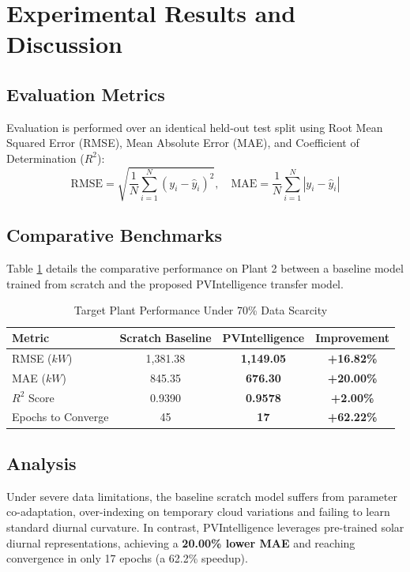 \documentclass[conference]{IEEEtran}
\begin{document}
\section{Experimental Results and Discussion}

\subsection{Evaluation Metrics}
Evaluation is performed over an identical held-out test split using Root Mean Squared Error (RMSE), Mean Absolute Error (MAE), and Coefficient of Determination ($R^2$):
\begin{equation}
\text{RMSE} = \sqrt{\frac{1}{N}\sum_{i=1}^N (y_i - \hat{y}_i)^2}, \quad \text{MAE} = \frac{1}{N}\sum_{i=1}^N |y_i - \hat{y}_i|
\end{equation}

\subsection{Comparative Benchmarks}
Table \ref{tab:comparison} details the comparative performance on Plant 2 between a baseline model trained from scratch and the proposed PVIntelligence transfer model.

\begin{table}[htbp]
\centering
\caption{Target Plant Performance Under 70\% Data Scarcity}
\label{tab:comparison}
\begin{tabular}{lccc}
\toprule
\textbf{Metric} & \textbf{Scratch Baseline} & \textbf{PVIntelligence} & \textbf{Improvement} \\
\midrule
RMSE ($kW$) & 1,381.38 & \textbf{1,149.05} & \textbf{+16.82\%} \\
MAE ($kW$) & 845.35 & \textbf{676.30} & \textbf{+20.00\%} \\
$R^2$ Score & 0.9390 & \textbf{0.9578} & \textbf{+2.00\%} \\
Epochs to Converge & 45 & \textbf{17} & \textbf{+62.22\%} \\
\bottomrule
\end{tabular}
\end{table}

\subsection{Analysis}
Under severe data limitations, the baseline scratch model suffers from parameter co-adaptation, over-indexing on temporary cloud variations and failing to learn standard diurnal curvature. In contrast, PVIntelligence leverages pre-trained solar diurnal representations, achieving a \textbf{20.00\% lower MAE} and reaching convergence in only 17 epochs (a 62.2\% speedup).
\end{document}
